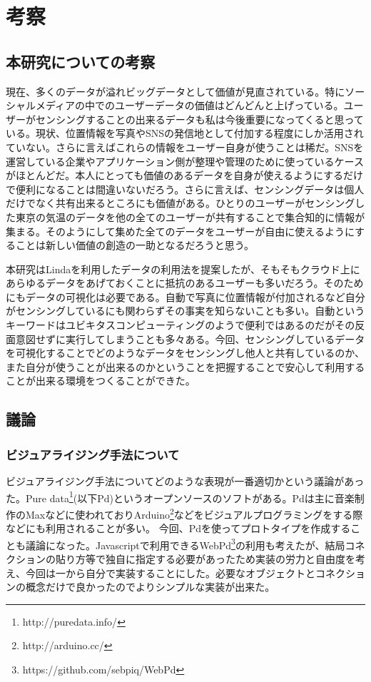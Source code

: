 \chapter{考察}
\label{chap:consideration}

\section{本研究についての考察}
現在、多くのデータが溢れビッグデータとして価値が見直されている。特にソーシャルメディアの中でのユーザーデータの価値はどんどんと上げっている。ユーザーがセンシングすることの出来るデータも私は今後重要になってくると思っている。現状、位置情報を写真やSNSの発信地として付加する程度にしか活用されていない。さらに言えばこれらの情報をユーザー自身が使うことは稀だ。SNSを運営している企業やアプリケーション側が整理や管理のために使っているケースがほとんどだ。本人にとっても価値のあるデータを自身が使えるようにするだけで便利になることは間違いないだろう。さらに言えば、センシングデータは個人だけでなく共有出来るところにも価値がある。ひとりのユーザーがセンシングした東京の気温のデータを他の全てのユーザーが共有することで集合知的に情報が集まる。そのようにして集めた全てのデータをユーザーが自由に使えるようにすることは新しい価値の創造の一助となるだろうと思う。

本研究はLindaを利用したデータの利用法を提案したが、そもそもクラウド上にあらゆるデータをあげておくことに抵抗のあるユーザーも多いだろう。そのためにもデータの可視化は必要である。自動で写真に位置情報が付加されるなど自分がセンシングしているにも関わらずその事実を知らないことも多い。自動というキーワードはユビキタスコンピューティングのようで便利ではあるのだがその反面意図せずに実行してしまうことも多々ある。今回、センシングしているデータを可視化することでどのようなデータをセンシングし他人と共有しているのか、また自分が使うことが出来るのかということを把握することで安心して利用することが出来る環境をつくることができた。

\section{議論}
\subsection{ビジュアライジング手法について}
ビジュアライジング手法についてどのような表現が一番適切かという議論があった。Pure data\footnote{http://puredata.info/}(以下Pd)というオープンソースのソフトがある。Pdは主に音楽制作のMaxなどに使われておりArduino\footnote{http://arduino.cc/}などをビジュアルプログラミングをする際などにも利用されることが多い。
今回、Pdを使ってプロトタイプを作成することも議論になった。Javascriptで利用できるWebPd\footnote{https://github.com/sebpiq/WebPd}の利用も考えたが、結局コネクションの貼り方等で独自に指定する必要があったため実装の労力と自由度を考え、今回は一から自分で実装することにした。必要なオブジェクトとコネクションの概念だけで良かったのでよりシンプルな実装が出来た。

